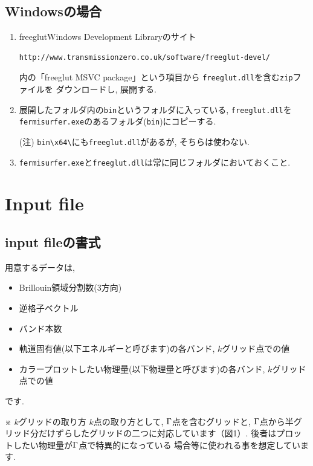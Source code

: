 \documentclass[12pt]{jarticle}
\begin{document}
\subsection{Windowsの場合}

\begin{enumerate}

\item freeglutWindows Development Libraryのサイト
\begin{verbatim}
http://www.transmissionzero.co.uk/software/freeglut-devel/
\end{verbatim}
内の「freeglut MSVC package」という項目から
\texttt{freeglut.dll}を含む\texttt{zip}ファイルを
ダウンロードし, 展開する.

\item 展開したフォルダ内の\texttt{bin}というフォルダに入っている,
\texttt{freeglut.dll}を\texttt{fermisurfer.exe}のあるフォルダ(\verb|bin|)にコピーする.

(注) \verb|bin\x64\|にも\verb|freeglut.dll|があるが, そちらは使わない.

\item \verb|fermisurfer.exe|と\verb|freeglut.dll|は常に同じフォルダにおいておくこと.

\end{enumerate}

\section{Input file}

\subsection{input fileの書式}

用意するデータは, 
\begin{itemize}
\item Brillouin領域分割数(3方向)
\item 逆格子ベクトル
\item バンド本数
\item 軌道固有値(以下エネルギーと呼びます)の各バンド, $k$グリッド点での値
\item カラープロットしたい物理量(以下物理量と呼びます)の各バンド, $k$グリッド点での値
\end{itemize}
です. 

※ $k$グリッドの取り方
$k$点の取り方として, ${\rm \Gamma}$点を含むグリッドと, 
${\rm \Gamma}$点から半グリッド分だけずらしたグリッドの二つに対応しています（図1）. 
後者はプロットしたい物理量が${\rm \Gamma}$点で特異的になっている
場合等に使われる事を想定しています. 
\end{document}
